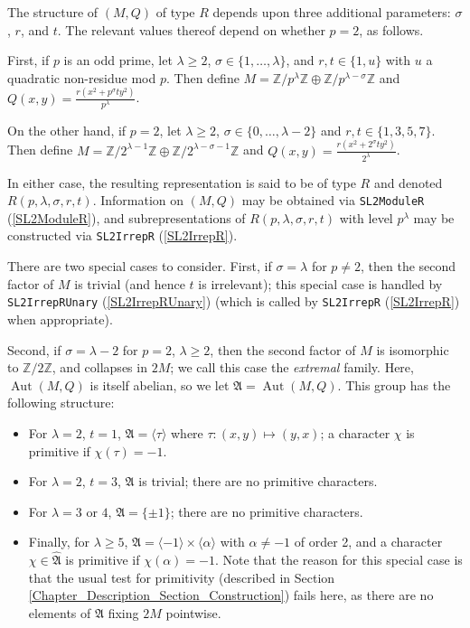 \documentclass[a4paper,11pt]{report}
\begin{document}
{{{ The structure of $(M,Q)$ of type $R$ depends upon three additional parameters: $\sigma$, $r$, and $t$. The relevant values thereof depend on whether $p=2$, as follows. 

 First, if $p$ is an odd prime, let $\lambda \geq 2$, $\sigma \in \{1, \dots, \lambda\}$, and $r,t \in \{1,u\}$ with $u$ a quadratic non-residue mod $p$. Then define $M = \mathbb{Z}/p^\lambda\mathbb{Z} \oplus
\mathbb{Z}/p^{\lambda-\sigma}\mathbb{Z}$ and $Q(x,y) = \frac{r(x^2 + p^\sigma t y^2)}{p^\lambda}$. 

 On the other hand, if $p=2$, let $\lambda \geq 2$, $\sigma \in \{0, \dots, \lambda-2\}$ and $r,t \in \{1,3,5,7\}$. Then define $M = \mathbb{Z}/2^{\lambda-1}\mathbb{Z} \oplus
\mathbb{Z}/2^{\lambda-\sigma-1}\mathbb{Z}$ and $Q(x,y) = \frac{r(x^2 + 2^\sigma t y^2)}{2^\lambda}$. 

 In either case, the resulting representation is said to be of type $R$ and denoted $R(p,\lambda,\sigma,r,t)$. Information on $(M,Q)$ may be obtained via \texttt{SL2ModuleR} (\ref{SL2ModuleR}), and subrepresentations of $R(p,\lambda,\sigma,r,t)$ with level $p^\lambda$ may be constructed via \texttt{SL2IrrepR} (\ref{SL2IrrepR}).

 There are two special cases to consider. First, if $\sigma = \lambda$ for $p \neq 2$, then the second factor of $M$ is trivial (and hence $t$ is irrelevant); this special case is handled by \texttt{SL2IrrepRUnary} (\ref{SL2IrrepRUnary}) (which is called by \texttt{SL2IrrepR} (\ref{SL2IrrepR}) when appropriate).

 Second, if $\sigma = \lambda - 2$ for $p = 2$, $\lambda \geq 2$, then the second factor of $M$ is isomorphic to $\mathbb{Z}/2\mathbb{Z}$, and collapses in $2M$; we call this case the \emph{extremal} family. Here, $\operatorname{Aut}(M,Q)$ is itself abelian, so we let $\mathfrak{A} = \operatorname{Aut}(M,Q)$. This group has the following structure:
\begin{itemize}
\item For $\lambda = 2$, $t=1$, $\mathfrak{A} = \langle \tau \rangle$ where $\tau : (x,y) \mapsto (y,x)$; a character $\chi$ is primitive if $\chi(\tau) = -1$.
\item For $\lambda = 2$, $t = 3$, $\mathfrak{A}$ is trivial; there are no primitive characters.
\item For $\lambda = 3$ or $4$, $\mathfrak{A} = \{\pm 1\}$; there are no primitive characters.
\item Finally, for $\lambda \geq 5$, $\mathfrak{A} = \langle -1 \rangle \times \langle \alpha \rangle$ with $\alpha \neq -1$ of order 2, and a character $\chi \in \widehat{\mathfrak{A}}$ is primitive if $\chi(\alpha) = -1$. Note that the reason for this special case is that the usual test for
primitivity (described in Section \ref{Chapter_Description_Section_Construction}) fails here, as there are no elements of $\mathfrak{A}$ fixing $2M$ pointwise.
\end{itemize}


}}}
\end{document}

